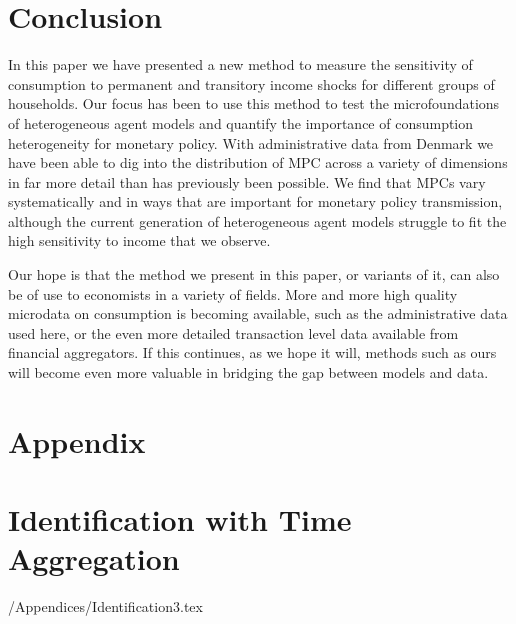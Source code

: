 \documentclass[titlepage]{\econtex}\newcommand{\texname}{ConsumptionHeterogeneity}
\begin{document}
\FloatBarrier

\section{Conclusion}
In this paper we have presented a new method to measure the sensitivity of consumption to permanent and transitory income shocks for different groups of households. Our focus has been to use this method to test the microfoundations of heterogeneous agent models and quantify the importance of consumption heterogeneity for monetary policy. With administrative data from Denmark we have been able to dig into the distribution of MPC across a variety of dimensions in far more detail than has previously been possible. We find that MPCs vary systematically and in ways that are important for monetary policy transmission, although the current generation of heterogeneous agent models struggle to fit the high sensitivity to income that we observe.

Our hope is that the method we present in this paper, or variants of it, can also be of use to economists in a variety of fields. More and more high quality microdata on consumption is becoming available, such as the administrative data used here, or the even more detailed transaction level data available from financial aggregators. If this continues, as we hope it will, methods such as ours will become even more valuable in bridging the gap between models and data.





\processdelayedfloats

\small

\normalsize

\pagebreak
\appendix
\renewcommand\thefigure{\thesection.\arabic{figure}}  
\renewcommand\thetable{\thesection.\arabic{table}}  

\section*{Appendix}

\section{Identification with Time Aggregation}\label{sec:Identification}

\setcounter{figure}{0}   
\setcounter{table}{0} 
\econtexRoot/Appendices/Identification3.tex

\end{document}
